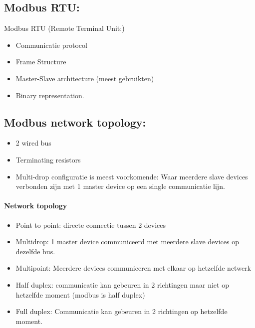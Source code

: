\documentclass[12pt]{article}
\begin{document}
\subsection{Modbus RTU:}
Modbus RTU (Remote Terminal Unit:)\begin{itemize}
    \item Communicatie protocol
    \item Frame Structure
    \item Master-Slave architecture (meest gebruikten)
    \item Binary representation.
\end{itemize}
\subsection{Modbus network topology:}
\begin{itemize}
    \item 2 wired bus
    \item Terminating resistors
    \item Multi-drop configuratie is meest voorkomende: Waar meerdere slave devices verbonden zijn met 1 master device op een single communicatie lijn.
\end{itemize}
\paragraph{Network topology}
\begin{itemize}
    \item Point to point: directe connectie tussen 2 devices
    \item Multidrop: 1 master device communiceerd met meerdere slave devices op dezelfde bus.
    \item Multipoint: Meerdere devices communiceren met elkaar op hetzelfde netwerk
    \item Half duplex: communicatie kan gebeuren in 2 richtingen maar niet op hetzelfde moment (modbus is half duplex)
    \item Full duplex: Communicatie kan gebeuren in 2 richtingen op hetzelfde moment.
\end{itemize}
\end{document}
